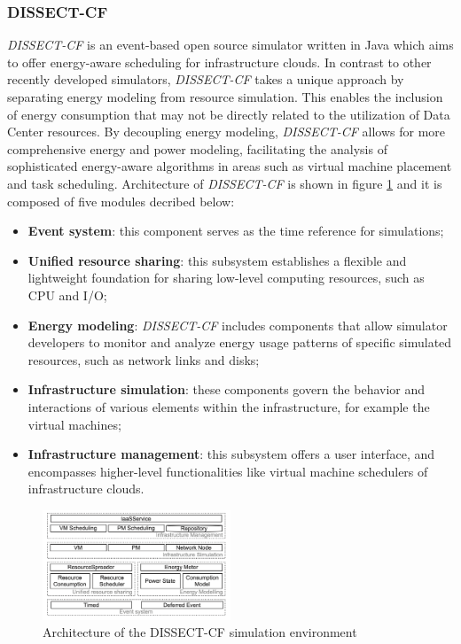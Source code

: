 {\subsubsection*{DISSECT-CF}
\emph{DISSECT-CF} \cite{kecskemeti2015dissect} is an event-based open source simulator written in Java which aims to offer energy-aware scheduling for infrastructure clouds. In contrast to other recently developed simulators, \emph{DISSECT-CF} takes a unique approach by separating energy modeling from resource simulation. This enables the inclusion of energy consumption that may not be directly related to the utilization of Data Center resources. By decoupling energy modeling, \emph{DISSECT-CF} allows for more comprehensive energy and power modeling, facilitating the analysis of sophisticated energy-aware algorithms in areas such as virtual machine placement and task scheduling. Architecture of \emph{DISSECT-CF} is shown in figure \ref{fig:dissect-cf_arch} and it is composed of five modules decribed below:
\begin{itemize}
    \item \textbf{Event system}: this component serves as the time reference for simulations;
    \item \textbf{Unified resource sharing}: this subsystem establishes a flexible and lightweight foundation for sharing low-level computing resources, such as CPU and I/O;
    \item \textbf{Energy modeling}: \emph{DISSECT-CF} includes components that allow simulator developers to monitor and analyze energy usage patterns of specific simulated resources, such as network links and disks;
    \item \textbf{Infrastructure simulation}: these components govern the behavior and interactions of various elements within the infrastructure, for example the virtual machines;
    \item \textbf{Infrastructure management}: this subsystem offers a user interface, and encompasses higher-level functionalities like virtual machine schedulers of infrastructure clouds.
\end{itemize}
\begin{figure}[h]
    \centering
    \includegraphics[width=0.5\textwidth]{chapters/images/dissect-cf_arch.png}
    \caption{Architecture of the DISSECT-CF simulation environment}
    \label{fig:dissect-cf_arch}
\end{figure}

}
